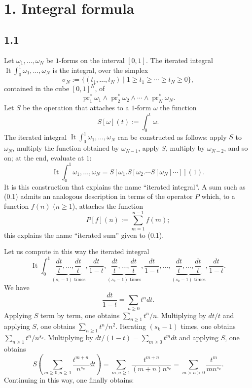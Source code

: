 \documentclass[10pt]{article}
\newcommand{\It}{\operatorname{It}}
\begin{document}
\section*{1. Integral formula}

\subsection*{1.1}
Let $\omega_1,\ldots,\omega_N$ be $1$-forms on the interval $[0,1]$.
The iterated integral $\It\int_0^1\omega_1,\ldots,\omega_N$ is the integral, over the simplex
\begin{equation}
\sigma_N:=\{(t_1,\ldots,t_N)\mid 1\geq t_1\geq\cdots\geq t_N\geq 0\},
\tag{1.1.1}
\end{equation}
contained in the cube $[0,1]^N$, of
\[
 \operatorname{pr}_1^*\omega_1\wedge \operatorname{pr}_2^*\omega_2\wedge\cdots\wedge \operatorname{pr}_N^*\omega_N.
\]
Let $S$ be the operation that attaches to a $1$-form $\omega$ the function
\[
 S[\omega](t):=\int_0^t\omega.
\]
The iterated integral $\It\int_0^1\omega_1,\ldots,\omega_N$ can be constructed as follows: apply $S$ to $\omega_N$, multiply the function obtained by $\omega_{N-1}$, apply $S$, multiply by $\omega_{N-2}$, and so on; at the end, evaluate at $1$:
\begin{equation}
\It\int_0^1\omega_1,\ldots,\omega_N
 = S[\omega_1.S[\omega_2.\cdots S[\omega_N]\cdots]](1).
\tag{1.1.2}
\end{equation}
It is this construction that explains the name ``iterated integral''.
A sum such as (0.1) admits an analogous description in terms of the operator $P$ which, to a function $f(n)$ ($n\geq1$), attaches the function
\[
 P[f](n):=\sum_{m=1}^{n-1}f(m);
\]
this explains the name ``iterated sum'' given to (0.1).

Let us compute in this way the iterated integral
\begin{equation}
\It\int_0^1
 \underbrace{\frac{dt}{t},\ldots,\frac{dt}{t}}_{(s_1-1)\text{ times}},
 \frac{dt}{1-t},
 \underbrace{\frac{dt}{t},\ldots,\frac{dt}{t}}_{(s_2-1)\text{ times}},
 \frac{dt}{1-t},\ldots,
 \underbrace{\frac{dt}{t},\ldots,\frac{dt}{t}}_{(s_k-1)\text{ times}},
 \frac{dt}{1-t}.
\tag{1.1.3}
\end{equation}
We have
\[
 \frac{dt}{1-t}=\sum_{n\geq0}t^n dt.
\]
Applying $S$ term by term, one obtains $\sum_{n\geq1}t^n/n$.
Multiplying by $dt/t$ and applying $S$, one obtains $\sum_{n\geq1}t^n/n^2$.
Iterating $(s_k-1)$ times, one obtains $\sum_{n\geq1}t^n/n^{s_k}$.
Multiplying by $dt/(1-t)=\sum_{m\geq0}t^m dt$ and applying $S$, one obtains
\[
S\left(\sum_{m\geq0,n\geq1}\frac{t^{m+n}}{n^{s_k}}dt\right)
 =\sum_{m,n\geq1}\frac{t^{m+n}}{(m+n)n^{s_k}}
 =\sum_{m>n>0}\frac{t^m}{mn^{s_k}}.
\]
Continuing in this way, one finally obtains:
\end{document}
